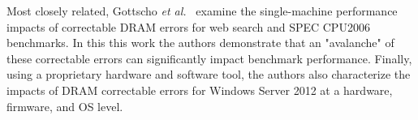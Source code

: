 Most closely related, Gottscho {\it et al.}~\cite{Gottscho:2017:Measuring}
examine the single-machine performance impacts of correctable DRAM errors for
web search and SPEC CPU2006 benchmarks.  In this this work the authors
demonstrate that an "avalanche" of these correctable errors can significantly
impact benchmark performance.  Finally, using a proprietary hardware and
software tool, the authors also characterize the impacts of DRAM correctable
errors for Windows Server 2012 at a hardware, firmware, and OS level.

